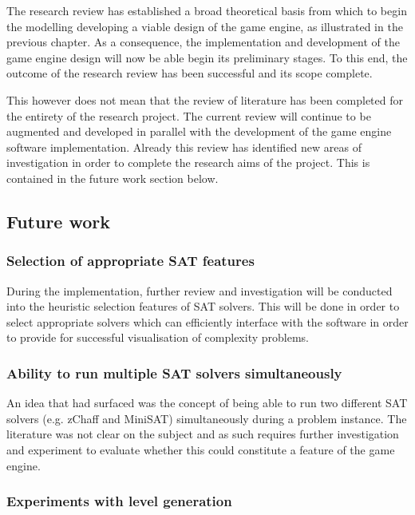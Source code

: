 \documentclass[11pt, a4paper, oneside]{report} %
\begin{document}
The research review has established a broad theoretical basis from which to begin the modelling
developing a viable design of the game engine, as illustrated in the previous chapter. As a
consequence, the implementation and development of the game engine design will now be able begin its
preliminary stages. To this end, the outcome of the research review has been successful and its
scope complete.

This however does not mean that the review of literature has been completed for the entirety of the
research project. The current review will continue to be augmented and developed in parallel with
the development of the game engine software implementation. Already this review has identified new
areas of investigation in order to complete the research aims of the project. This is contained in
the future work section below.

\subsection{Future work}

\subsubsection{Selection of appropriate SAT features}

During the implementation, further review and investigation will be conducted into the heuristic
selection features of SAT solvers. This will be done in order to select appropriate solvers which
can efficiently interface with the software in order to provide for successful visualisation of
complexity problems.

\subsubsection{Ability to run multiple SAT solvers simultaneously}

An idea that had surfaced was the concept of being able to run two different SAT solvers (e.g.
zChaff and MiniSAT) simultaneously during a problem instance. The literature was not clear on the
subject and as such requires further investigation and experiment to evaluate whether this could
constitute a feature of the game engine.

\subsubsection{Experiments with level generation}
\end{document}
